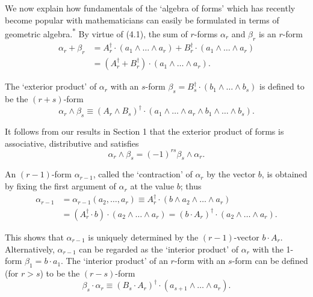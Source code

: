\documentclass[fleqn]{scrartcl}
\numberwithin{equation}{section}
\begin{document}
\vspace{1em}
\noindent We now explain how fundamentals of the `algebra of forms' which has recently become popular with mathematicians can easily be formulated in terms of geometric algebra.\textsuperscript{*} By virtue of (4.1), the sum of \(r\)-forms \(\alpha_r\) and \(\beta_r\) is an \(r\)-form
\begin{equation}
\begin{aligned}
\alpha_r + \beta_r &= A_r^{\dagger} \cdot (a_1 \wedge \dots \wedge a_r) + B_r^{\dagger} \cdot (a_1 \wedge \dots \wedge a_r) \\
&= (A_r^{\dagger} + B_r^{\dagger}) \cdot (a_1 \wedge \dots \wedge a_r).
\end{aligned}
\tag{4.3}
\end{equation}

\noindent The `exterior product' of \(\alpha_r\) with an \(s\)-form \(\beta_s = B_s^{\dagger} \cdot (b_1 \wedge \dots \wedge b_s)\) is defined to be the \((r+s)\)-form
\begin{equation}
\alpha_r \wedge \beta_s \equiv (A_r \wedge B_s)^{\dagger} \cdot (a_1 \wedge \dots \wedge a_r \wedge b_1 \wedge \dots \wedge b_s). \tag{4.4}
\end{equation}

\noindent It follows from our results in Section 1 that the exterior product of forms is associative, distributive and satisfies
\begin{equation}
\alpha_r \wedge \beta_s = (-1)^{rs}\beta_s \wedge \alpha_r. \tag{4.5}
\end{equation}

\vspace{1em}
\noindent An \((r-1)\)-form \(\alpha_{r-1}\), called the `contraction' of \(\alpha_r\) by the vector \(b\), is obtained by fixing the first argument of \(\alpha_r\) at the value \(b\); thus
\begin{equation}
\begin{aligned}
\alpha_{r-1} &= \alpha_{r-1}(a_2, \dots, a_r) \equiv A_r^{\dagger} \cdot (b \wedge a_2 \wedge \dots \wedge a_r) \\
&= (A_r^{\dagger} \cdot b) \cdot (a_2 \wedge \dots \wedge a_r) = (b \cdot A_r)^{\dagger} \cdot (a_2 \wedge \dots \wedge a_r).
\end{aligned}
\tag{4.6}
\end{equation}

\noindent This shows that \(\alpha_{r-1}\) is uniquely determined by the \((r-1)\)-vector \(b \cdot A_r\). Alternatively, \(\alpha_{r-1}\) can be regarded as the `interior product' of \(\alpha_r\) with the 1-form \(\beta_1 = b \cdot a_1\). The `interior product' of an \(r\)-form with an \(s\)-form can be defined (for \(r > s\)) to be the \((r-s)\)-form
\begin{equation}
\beta_s \cdot \alpha_r \equiv (B_s \cdot A_r)^{\dagger} \cdot (a_{s+1} \wedge \dots \wedge a_r). \tag{4.7}
\end{equation}
\end{document}
